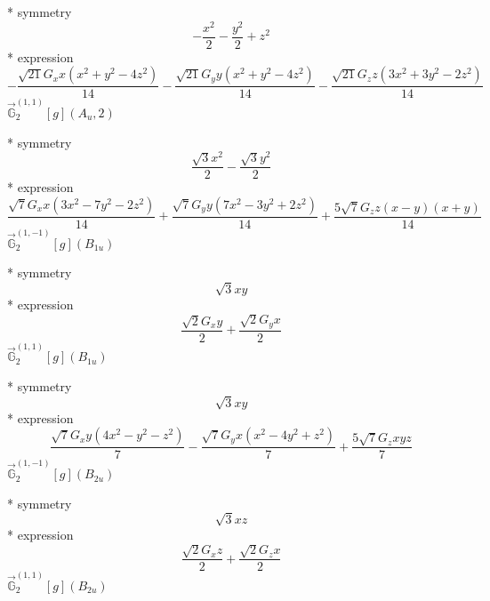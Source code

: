 \documentclass[fleqn,8pt]{jsarticle}
\begin{document}
\noindent\quad ** symmetry
\begin{dmath*}
- \frac{x^{2}}{2} - \frac{y^{2}}{2} + z^{2}
\end{dmath*}
\noindent\quad ** expression
\begin{dmath*}
- \frac{\sqrt{21} G_{x} x \left(x^{2} + y^{2} - 4 z^{2}\right)}{14} - \frac{\sqrt{21} G_{y} y \left(x^{2} + y^{2} - 4 z^{2}\right)}{14} - \frac{\sqrt{21} G_{z} z \left(3 x^{2} + 3 y^{2} - 2 z^{2}\right)}{14}
\end{dmath*}
\noindent\quad $\vec{\mathbb{G}}_{2}^{(1,1)}[g](A_{u},2)$

\noindent\quad ** symmetry
\begin{dmath*}
\frac{\sqrt{3} x^{2}}{2} - \frac{\sqrt{3} y^{2}}{2}
\end{dmath*}
\noindent\quad ** expression
\begin{dmath*}
\frac{\sqrt{7} G_{x} x \left(3 x^{2} - 7 y^{2} - 2 z^{2}\right)}{14} + \frac{\sqrt{7} G_{y} y \left(7 x^{2} - 3 y^{2} + 2 z^{2}\right)}{14} + \frac{5 \sqrt{7} G_{z} z \left(x - y\right) \left(x + y\right)}{14}
\end{dmath*}
\noindent\quad $\vec{\mathbb{G}}_{2}^{(1,-1)}[g](B_{1u})$

\noindent\quad ** symmetry
\begin{dmath*}
\sqrt{3} x y
\end{dmath*}
\noindent\quad ** expression
\begin{dmath*}
\frac{\sqrt{2} G_{x} y}{2} + \frac{\sqrt{2} G_{y} x}{2}
\end{dmath*}
\noindent\quad $\vec{\mathbb{G}}_{2}^{(1,1)}[g](B_{1u})$

\noindent\quad ** symmetry
\begin{dmath*}
\sqrt{3} x y
\end{dmath*}
\noindent\quad ** expression
\begin{dmath*}
\frac{\sqrt{7} G_{x} y \left(4 x^{2} - y^{2} - z^{2}\right)}{7} - \frac{\sqrt{7} G_{y} x \left(x^{2} - 4 y^{2} + z^{2}\right)}{7} + \frac{5 \sqrt{7} G_{z} x y z}{7}
\end{dmath*}
\noindent\quad $\vec{\mathbb{G}}_{2}^{(1,-1)}[g](B_{2u})$

\noindent\quad ** symmetry
\begin{dmath*}
\sqrt{3} x z
\end{dmath*}
\noindent\quad ** expression
\begin{dmath*}
\frac{\sqrt{2} G_{x} z}{2} + \frac{\sqrt{2} G_{z} x}{2}
\end{dmath*}
\noindent\quad $\vec{\mathbb{G}}_{2}^{(1,1)}[g](B_{2u})$
\end{document}
